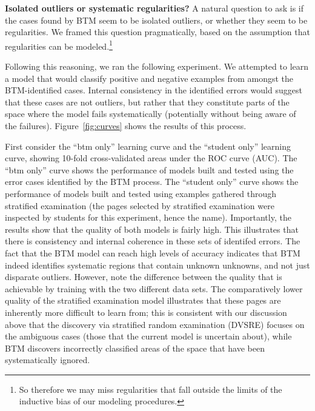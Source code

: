 \textbf{Isolated outliers or systematic regularities?}  A natural question to ask is if the cases found by BTM seem to be isolated outliers, or whether they seem to be regularities.  We framed this question pragmatically, based on the assumption that regularities can be modeled.\footnote{So therefore we may miss regularities that fall outside the limits of the inductive bias of our modeling procedures.} 

Following this reasoning, we ran the following experiment.  We attempted to learn a model that would classify positive and negative examples from amongst the BTM-identified cases.  Internal consistency in the identified errors would suggest that these cases are not outliers, but rather that they constitute parts of the space where the model fails systematically (potentially without being aware of the failures).
Figure~\ref{fig:curves} shows the results of this process. 

First consider the ``btm only'' learning curve and the ``student only'' learning curve, showing 10-fold cross-validated areas under the ROC curve (AUC).
The ``btm only'' curve shows the performance of models built and tested
using the error cases identified by the BTM process.  The ``student
only'' curve shows the performance of models built and tested using
examples gathered through stratified examination (the pages selected
by stratified examination were inspected by students for this
experiment, hence the name).  Importantly,
the results show that the quality of both models is fairly high.  This
illustrates that there is consistency and internal coherence in these
sets of identifed errors.  The fact that the BTM model can reach high levels of
accuracy indicates that BTM indeed identifies systematic regions that
contain unknown unknowns, and not just disparate outliers.  However,
note the difference between the quality that is achievable by training
with the two different data sets.  The comparatively lower quality of
the stratified examination model illustrates that these pages are inherently
more difficult to learn from; this is consistent with our discussion
above that the discovery via stratified random examination (DVSRE)
focuses on the ambiguous cases (those that the current model is
uncertain about), while BTM discovers incorrectly classified areas of
the space that have been systematically ignored.

